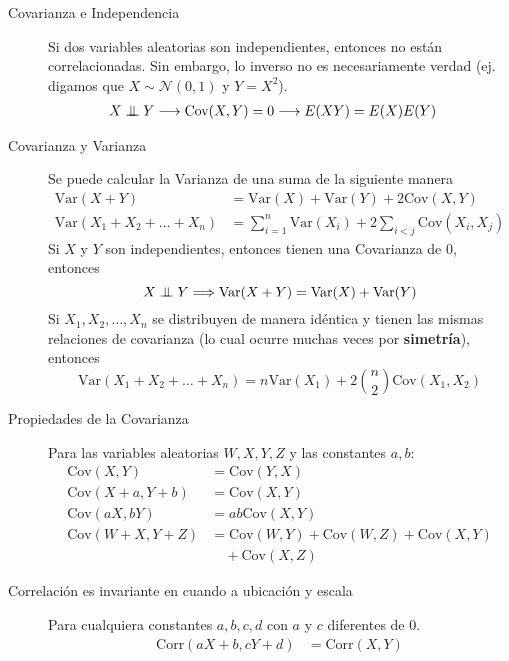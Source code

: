 \documentclass[12,landscape]{article}
\newcommand\independent{\protect\mathpalette{\protect\independenT}{\perp}}
\def\independenT#1#2{\mathrel{\setbox0\hbox{$#1#2$}%
    \copy0\kern-\wd0\mkern4mu\box0}}
\newcommand{\var}{\textrm{Var}}
\newcommand{\cov}{\textrm{Cov}}
\newcommand{\corr}{\textrm{Corr}}
\newcommand{\N}{\mathcal{N}}
\begin{document}
\begin{multicols*}{3}
\begin{description}
\item [Covarianza e Independencia] Si dos variables aleatorias son independientes, entonces no están correlacionadas. Sin embargo, lo inverso no es necesariamente verdad (ej. digamos que $X \sim \N(0,1)$ y $Y = X^2$).
    \begin{align*}
    	X \independent Y &\longrightarrow \cov(X, Y) = 0 \longrightarrow E(XY) = E(X)E(Y)
    \end{align*}
\item [Covarianza y Varianza] Se puede calcular la Varianza de una suma de la siguiente manera
    \begin{align*}
        \var(X + Y) &= \var(X) + \var(Y) + 2\cov(X, Y) \\
        \var(X_1 + X_2 + \dots + X_n ) &= \sum_{i = 1}^{n}\var(X_i) + 2\sum_{i < j} \cov(X_i, X_j)
    \end{align*}
    Si $X$ y $Y$ son independientes, entonces tienen una Covarianza de $0$, entonces
    \[X \independent Y \Longrightarrow \var(X + Y) = \var(X) + \var(Y)\]
    Si $X_1,X_2, \dots, X_n$ se distribuyen de manera idéntica y tienen las mismas relaciones de covarianza (lo cual ocurre muchas veces por \textbf{simetría}), entonces
    \[\var(X_1 + X_2 + \dots + X_n ) = n\var(X_1) + 2{n \choose 2}\cov(X_1, X_2)\]
    
\item [Propiedades de la Covarianza]  Para las variables aleatorias $W,X,Y,Z$ y las constantes $a, b$: 
    \begin{align*}
    	\cov(X, Y) &= \cov(Y, X) \\
        \cov(X + a, Y + b) &= \cov(X, Y) \\
        \cov(aX, bY) &= ab\cov(X, Y) \\
        \cov(W + X, Y + Z) &= \cov(W, Y) + \cov(W, Z) + \cov(X, Y)\\
        &\quad + \cov(X, Z)
    \end{align*}
\item [Correlación es invariante en cuando a ubicación y escala] Para cualquiera constantes $a,b,c,d$ con $a$ y $c$ diferentes de $0$.
    \begin{align*}
        \corr(aX + b, cY + d) &= \corr(X, Y) 
    \end{align*}
\end{description}


\end{multicols*}
\end{document}
